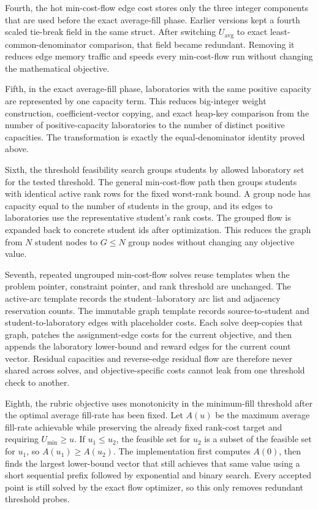 \documentclass[11pt,a4paper]{article}
\begin{document}
Fourth, the hot min-cost-flow edge cost stores only the three integer
components that are used before the exact average-fill phase.  Earlier
versions kept a fourth scaled tie-break field in the same struct.  After
switching \(U_{\mathrm{avg}}\) to exact least-common-denominator comparison, that
field became redundant.  Removing it reduces edge memory traffic and speeds
every min-cost-flow run without changing the mathematical objective.

Fifth, in the exact average-fill phase, laboratories with the same positive
capacity are represented by one capacity term.  This reduces big-integer
weight construction, coefficient-vector copying, and exact heap-key
comparison from the number of positive-capacity laboratories to the number of
distinct positive capacities.  The transformation is exactly the
equal-denominator identity proved above.

Sixth, the threshold feasibility search groups students by allowed laboratory
set for the tested threshold.  The general min-cost-flow path then groups
students with identical active rank rows for the fixed worst-rank bound.  A
group node has capacity equal to the number of students in the group, and its
edges to laboratories use the representative student's rank costs.  The
grouped flow is expanded back to concrete student ids after optimization.
This reduces the graph from \(N\) student nodes to \(G\leq N\) group nodes
without changing any objective value.

Seventh, repeated ungrouped min-cost-flow solves reuse templates when the
problem pointer, constraint pointer, and rank threshold are unchanged.  The
active-arc template records the student--laboratory arc list and adjacency
reservation counts.  The immutable graph template records source-to-student
and student-to-laboratory edges with placeholder costs.  Each solve deep-copies
that graph, patches the assignment-edge costs for the current objective, and
then appends the laboratory lower-bound and reward edges for the current count
vector.  Residual capacities and reverse-edge residual flow are therefore never
shared across solves, and objective-specific costs cannot leak from one
threshold check to another.

Eighth, the rubric objective uses monotonicity in the minimum-fill threshold
after the optimal average fill-rate has been fixed.  Let \(A(u)\) be the
maximum average fill-rate achievable while preserving the already fixed
rank-cost target and requiring \(U_{\min}\ge u\).  If \(u_1\le u_2\), the
feasible set for \(u_2\) is a subset of the feasible set for \(u_1\), so
\(A(u_1)\ge A(u_2)\).  The implementation first computes \(A(0)\), then finds
the largest lower-bound vector that still achieves that same value using a
short sequential prefix followed by exponential and binary search.  Every
accepted point is still solved by the exact flow optimizer, so this only
removes redundant threshold probes.
\end{document}
